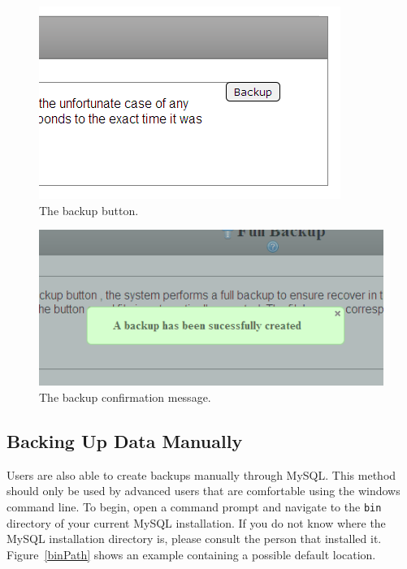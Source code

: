 \documentclass[a4paper,10pt]{report}
\begin{document}
\begin{figure}[h!]
	\begin{center}
	\includegraphics{backupButton.png}
	\end{center}
	\caption{The backup button.}
	\label{backupButton}
\end{figure}
\begin{figure}[h!]
	\begin{center}
	\includegraphics{backupConfirmation.png}
	\end{center}
	\caption{The backup confirmation message.}
	\label{backupConfirmation}
\end{figure}

\subsection{Backing Up Data Manually}
\label{sec:manualBackup}

\par \noindent \hspace*{1cm} Users are also able to create backups manually through MySQL.  This method should only be used by advanced users that are comfortable using the windows command line.  To begin, open a command prompt and navigate to the \verb|bin| directory of your current MySQL installation.  If you do not know where the MySQL installation directory is, please consult the person that installed it. Figure~\ref{binPath} shows an example containing a possible default location.
\end{document}
